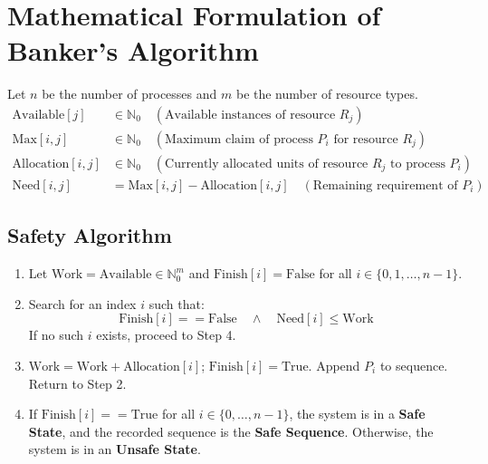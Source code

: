 \documentclass[11pt,a4paper]{article}
\begin{document}
\section{Mathematical Formulation of Banker's Algorithm}

Let $n$ be the number of processes and $m$ be the number of resource types.
\begin{align*}
    \text{Available}[j] &\in \mathbb{N}_0 \quad (\text{Available instances of resource } R_j) \\
    \text{Max}[i, j] &\in \mathbb{N}_0 \quad (\text{Maximum claim of process } P_i \text{ for resource } R_j) \\
    \text{Allocation}[i, j] &\in \mathbb{N}_0 \quad (\text{Currently allocated units of resource } R_j \text{ to process } P_i) \\
    \text{Need}[i, j] &= \text{Max}[i, j] - \text{Allocation}[i, j] \quad (\text{Remaining requirement of } P_i)
\end{align*}

\subsection{Safety Algorithm}
\begin{enumerate}[leftmargin=1.5em,noitemsep]
    \item Let $\text{Work} = \text{Available} \in \mathbb{N}_0^m$ and $\text{Finish}[i] = \text{False}$ for all $i \in \{0, 1, \dots, n-1\}$.
    \item Search for an index $i$ such that:
    $$\text{Finish}[i] == \text{False} \quad \land \quad \text{Need}[i] \le \text{Work}$$
    If no such $i$ exists, proceed to Step 4.
    \item $\text{Work} = \text{Work} + \text{Allocation}[i]$; \quad $\text{Finish}[i] = \text{True}$. Append $P_i$ to sequence. Return to Step 2.
    \item If $\text{Finish}[i] == \text{True}$ for all $i \in \{0, \dots, n-1\}$, the system is in a \textbf{Safe State}, and the recorded sequence is the \textbf{Safe Sequence}. Otherwise, the system is in an \textbf{Unsafe State}.
\end{enumerate}
\end{document}

